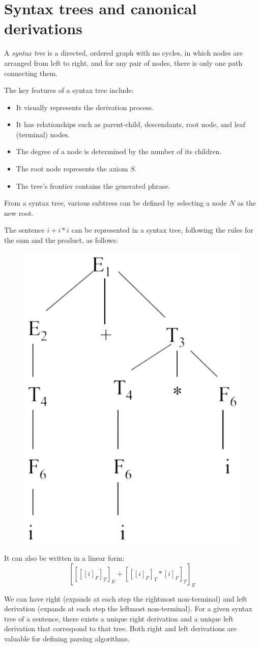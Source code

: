 \section{Syntax trees and canonical derivations}

\begin{definition}
    A \emph{syntax tree} is a directed, ordered graph with no cycles, in which nodes are arranged from left to right, and for any pair of nodes, there is only one path connecting them.
\end{definition}
The key features of a syntax tree include:
\begin{itemize}
    \item It visually represents the derivation process.
    \item It has relationships such as parent-child, descendants, root node, and leaf (terminal) nodes.
    \item The degree of a node is determined by the number of its children.
    \item The root node represents the axiom $S$.
    \item The tree's frontier contains the generated phrase.
\end{itemize}
From a syntax tree, various subtrees can be defined by selecting a node $N$ as the new root.
\begin{example}
    The sentence $i+i*i$ can be represented in a syntax tree, following the rules for the sum and the product, as follows: 
    \begin{figure}[H]
        \centering
        \includegraphics[width=0.25\linewidth]{images/syntree.png}
    \end{figure}
    It can also be written in a linear form: 
    \[[[[[i]_F]_T]_E+[[[i]_F]_T*[i]_F]_T]_E\]
\end{example}

We can have right (expands at each step the rightmost non-terminal) and left derivation (expands at each step the leftmost non-terminal). 
For a given syntax tree of a sentence, there exists a unique right derivation and a unique left derivation that correspond to that tree. 
Both right and left derivations are valuable for defining parsing algorithms.


